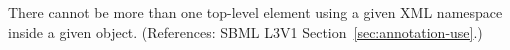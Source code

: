 There cannot be more than one top-level element using a given XML namespace
inside a given \Annotation object.  (References: SBML 
L3V1 Section~\ref{sec:annotation-use}.)

